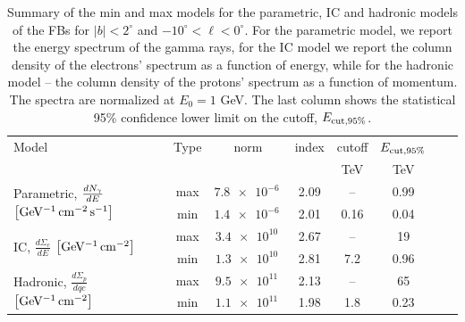 \begin{table}
  \begin{center}
    \caption{Summary of the min and max models for the parametric, 
    IC and hadronic models of the FBs for $|b| < 2^\circ$ and $-10^\circ < \ell < 0^\circ$. 
    For the parametric model, we report the energy spectrum of the gamma rays,
    for the IC model we report the column density of the electrons' spectrum as a function of energy,
    while for the hadronic model -- the column density of the protons' spectrum as a function of momentum.
    The spectra are normalized at $E_0 = 1$ GeV. The last column shows the statistical 95\% confidence lower limit on the cutoff, $E_{\rm cut, 95\%}$.}
    \label{tab:summary}
    \begin{tabular}{| l |c|c|c|c|c|c|c|} %
     	\hline
		 {\hspace{2cm}Model} & Type  & norm & index & cutoff & $E_{\rm cut, 95\%}$ \\ 
		       &        &   &  & {\rm\small TeV} & {\rm\small TeV}\\ 
		\hline
  		\multirow{2}{*}{Parametric, $\frac{dN_\gamma}{dE}$ {\small $\left[{\rm {GeV^{-1}\, cm^{-2}\, s^{-1} }}\right]$}} & max &  $\SI{7.8e-6}{}$ \red{}& 2.09 \red{} &  -- & 0.99 \red{} \\ 
		& min & $\SI{1.4e-6}{}$ \red{}& 2.01 \red{} & 0.16 \red{} & 0.04 \red{} \\ 
 		\hline
  		\multirow{2}{*}{IC, $\frac{d\Sigma_e}{dE}$ {\small $\left[{\rm {GeV^{-1}\, cm^{-2}}}\right]$}} & max & $\SI{3.4e10}{}$ & 2.67 &  -- & 19 \\ 
		& min & $\SI{1.3e10}{}$ & 2.81 &  7.2 & 0.96 \\ 
 		\hline
  		\multirow{2}{*}{Hadronic, $\frac{d\Sigma_p}{dqc}$ {\small $\left[{\rm {GeV^{-1}\, cm^{-2}}}\right]$}} & max & $\SI{9.5e11}{}$ & 2.13 &  -- &65 \\ 
		& min & $\SI{1.1e11}{}$ & 1.98 &  1.8 & 0.23  \\ 
 \hline
    \end{tabular}
  \end{center}
\end{table}



